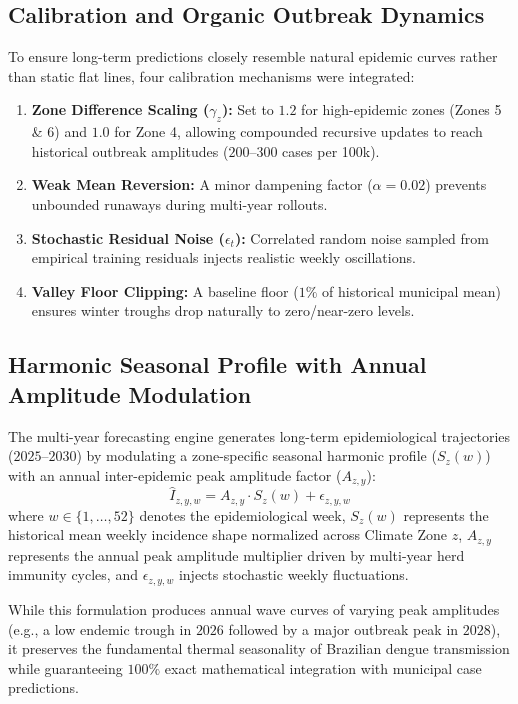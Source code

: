 \documentclass[journal,onecolumn,11pt]{IEEEtran}
\begin{document}
\subsection{Calibration and Organic Outbreak Dynamics}
To ensure long-term predictions closely resemble natural epidemic curves rather than static flat lines, four calibration mechanisms were integrated:
\begin{enumerate}
    \item \textbf{Zone Difference Scaling ($\gamma_z$):} Set to $1.2$ for high-epidemic zones (Zones 5 \& 6) and $1.0$ for Zone 4, allowing compounded recursive updates to reach historical outbreak amplitudes ($200$--$300$ cases per 100k).
    \item \textbf{Weak Mean Reversion:} A minor dampening factor ($\alpha = 0.02$) prevents unbounded runaways during multi-year rollouts.
    \item \textbf{Stochastic Residual Noise ($\epsilon_t$):} Correlated random noise sampled from empirical training residuals injects realistic weekly oscillations.
    \item \textbf{Valley Floor Clipping:} A baseline floor ($1\%$ of historical municipal mean) ensures winter troughs drop naturally to zero/near-zero levels.
\end{enumerate}

\subsection{Harmonic Seasonal Profile with Annual Amplitude Modulation}
The multi-year forecasting engine generates long-term epidemiological trajectories ($2025$--$2030$) by modulating a zone-specific seasonal harmonic profile ($S_z(w)$) with an annual inter-epidemic peak amplitude factor ($A_{z,y}$):
\begin{equation}
    \hat{I}_{z,y,w} = A_{z,y} \cdot S_z(w) + \epsilon_{z,y,w}
\end{equation}
where $w \in \{1, \dots, 52\}$ denotes the epidemiological week, $S_z(w)$ represents the historical mean weekly incidence shape normalized across Climate Zone $z$, $A_{z,y}$ represents the annual peak amplitude multiplier driven by multi-year herd immunity cycles, and $\epsilon_{z,y,w}$ injects stochastic weekly fluctuations. 

While this formulation produces annual wave curves of varying peak amplitudes (e.g., a low endemic trough in $2026$ followed by a major outbreak peak in $2028$), it preserves the fundamental thermal seasonality of Brazilian dengue transmission while guaranteeing $100\%$ exact mathematical integration with municipal case predictions.
\end{document}
